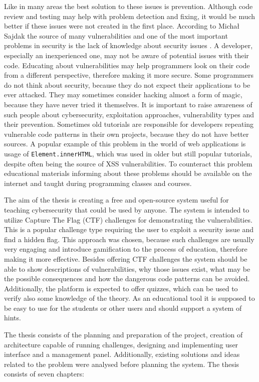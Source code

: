 Like in many areas the best solution to these issues is prevention. Although code review and testing may help with problem detection and fixing, it would be much better if these issues were not created in the first place. According to Michał Sajdak the source of many vulnerabilities and one of the most important problems in security is the lack of knowledge about security issues \cite{bib:securitum-wstep}. A developer, especially an inexperienced one, may not be aware of potential issues with their code. Educating about vulnerabilities may help programmers look on their code from a different perspective, therefore making it more secure. Some programmers do not think about security, because they do not expect their applications to be ever attacked. They may sometimes consider hacking almost a form of magic, because they have never tried it themselves. It is important to raise awareness of such people about cybersecurity, exploitation approaches, vulnerability types and their prevention. Sometimes old tutorials are responsible for developers repeating vulnerable code patterns in their own projects, because they do not have better sources. A popular example of this problem in the world of web applications is usage of \texttt{Element.innerHTML}, which was used in older but still popular tutorials, despite often being the source of XSS vulnerabilities. To counteract this problem educational materials informing about these problems should be available on the internet and taught during programming classes and courses.

The aim of the thesis is creating a free and open-source system useful for teaching cybersecurity that could be used by anyone. The system is intended to utilize Capture The Flag (CTF) challenges for demonstrating the vulnerabilities. This is a popular challenge type requiring the user to exploit a security issue and find a hidden flag. This approach was chosen, because such challenges are usually very engaging and introduce gamification to the process of education, therefore making it more effective. Besides offering CTF challenges the system should be able to show descriptions of vulnerabilities, why those issues exist, what may be the possible consequences and how the dangerous code patterns can be avoided. Additionally, the platform is expected to offer quizzes, which can be used to verify also some knowledge of the theory. As an educational tool it is supposed to be easy to use for the students or other users and should support a system of hints.

The thesis consists of the planning and preparation of the project, creation of architecture capable of running challenges, designing and implementing user interface and a management panel. Additionally, existing solutions and ideas related to the problem were analysed before planning the system. The thesis consists of seven chapters:

